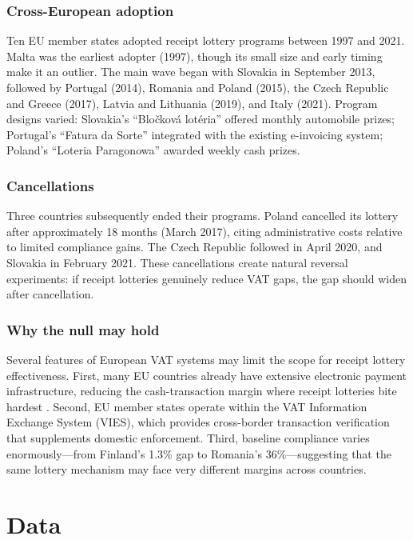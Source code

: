 \documentclass[12pt]{article}
\begin{document}
\subsubsection*{Cross-European adoption} Ten EU member states adopted receipt lottery programs between 1997 and 2021. Malta was the earliest adopter (1997), though its small size and early timing make it an outlier. The main wave began with Slovakia in September 2013, followed by Portugal (2014), Romania and Poland (2015), the Czech Republic and Greece (2017), Latvia and Lithuania (2019), and Italy (2021). Program designs varied: Slovakia's ``Blo\v{c}kov\'{a} lot\'{e}ria'' offered monthly automobile prizes; Portugal's ``Fatura da Sorte'' integrated with the existing e-invoicing system; Poland's ``Loteria Paragonowa'' awarded weekly cash prizes.

\subsubsection*{Cancellations} Three countries subsequently ended their programs. Poland cancelled its lottery after approximately 18 months (March 2017), citing administrative costs relative to limited compliance gains. The Czech Republic followed in April 2020, and Slovakia in February 2021. These cancellations create natural reversal experiments: if receipt lotteries genuinely reduce VAT gaps, the gap should widen after cancellation.

\subsubsection*{Why the null may hold} Several features of European VAT systems may limit the scope for receipt lottery effectiveness. First, many EU countries already have extensive electronic payment infrastructure, reducing the cash-transaction margin where receipt lotteries bite hardest \citep{immordino2009}. Second, EU member states operate within the VAT Information Exchange System (VIES), which provides cross-border transaction verification that supplements domestic enforcement. Third, baseline compliance varies enormously---from Finland's 1.3\% gap to Romania's 36\%---suggesting that the same lottery mechanism may face very different margins across countries.

\section{Data}
\label{sec:data}
\end{document}
